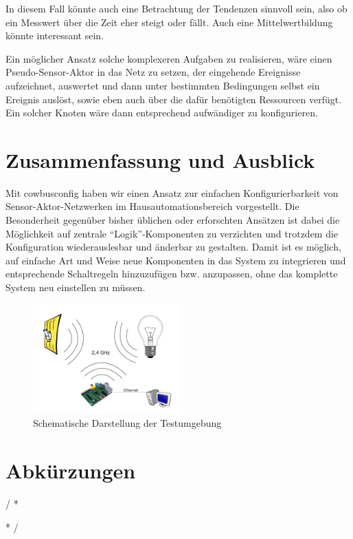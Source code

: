\documentclass{IEEEtran}
\begin{document}
    In diesem Fall könnte auch eine Betrachtung der Tendenzen sinnvoll sein,
    also ob ein Messwert über die Zeit eher steigt oder fällt.
    Auch eine Mittelwertbildung könnte interessant sein.

    Ein möglicher Ansatz solche komplexeren Aufgaben zu realisieren,
    wäre einen Pseudo-Sensor-Aktor in das Netz zu setzen, der eingehende
    Ereignisse aufzeichnet, auswertet und dann unter bestimmten Bedingungen
    selbst ein Ereignis auslöst, sowie eben auch über die dafür benötigten
    Ressourcen verfügt. Ein solcher Knoten wäre dann entsprechend
    aufwändiger zu konfigurieren.


\section{Zusammenfassung und Ausblick}
    Mit cowbusconfig haben wir einen Ansatz zur einfachen Konfigurierbarkeit
    von Sensor-Aktor-Netzwerken im Hausautomationsbereich vorgestellt.
    Die Besonderheit gegenüber bisher üblichen oder erforschten Ansätzen ist
    dabei die Möglichkeit auf zentrale \enquote{Logik}-Komponenten
    zu verzichten und trotzdem die Konfiguration wiederauslesbar und
    änderbar zu gestalten.
    Damit ist es möglich, auf einfache Art und Weise neue Komponenten in das
    System zu integrieren und entsprechende Schaltregeln hinzuzufügen bzw.
    anzupassen, ohne das komplette System neu einstellen zu müssen.


        \begin{figure}
            \centering
            \includegraphics[width=0.5\textwidth]{img/system}
            \caption{Schematische Darstellung der Testumgebung}
            \label{fig:comp}
        \end{figure}


\section*{Abkürzungen}
\renewcommand{\IEEEiedlistdecl}{\IEEEsetlabelwidth{CSMA/CA}}
\begin{acronym}
\end{acronym}
\renewcommand{\IEEEiedlistdecl}{\relax}%

\comment / *
\listoffigures
\clearpage

\listoftables
\clearpage
* /




\end{document}
